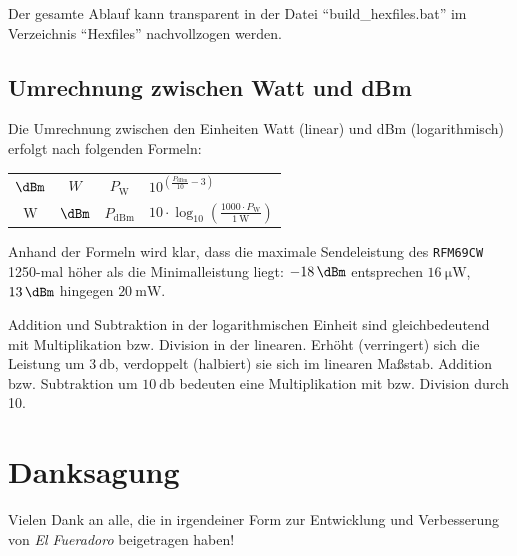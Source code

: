 \documentclass[paper=a4, parskip, numbers=noenddot, toc=listof, headsepline]{scrbook}
\newcommand{\anlage}{\emph{El Fueradoro}}
\begin{document}
				Der gesamte Ablauf kann transparent in der Datei \enquote{build\_hexfiles.bat} im Verzeichnis \enquote{Hexfiles} nachvollzogen werden.

			\section{Umrechnung zwischen Watt und dBm}
				Die Umrechnung zwischen den Einheiten Watt (linear) und dBm (logarithmisch) erfolgt nach folgenden Formeln:

				\begin{center}
					\begin{tabu}
						to .6
						$\si{\dBm}$  & $\si{W}$    & $P_\text{W}$   & $10^{\left(\frac{P_\text{dBm}}{10}-3\right)}$                                      \\[12pt]
						$\si{\watt}$ & $\si{\dBm}$ & $P_\text{dBm}$ & $10 {\cdot} \log_{10}\left( \frac{1000 {\cdot} P_\text{W}}{\SI{1}{\watt}} \right)$ \\
					\end{tabu}
				\end{center}

				Anhand der Formeln wird klar, dass die maximale Sendeleistung des \texttt{RFM69CW} 1250-mal höher als die Minimalleistung liegt: $\SI{-18}{\dBm}$ entsprechen $\SI{16}{\micro\watt}$, $\SI{13}{\dBm}$ hingegen $\SI{20}{\milli\watt}$.

				Addition und Subtraktion in der logarithmischen Einheit sind gleichbedeutend mit Multiplikation bzw. Division in der linearen. Erhöht (verringert) sich die Leistung um $\SI{3}{\decibel}$, verdoppelt (halbiert) sie sich im linearen Maßstab. Addition bzw. Subtraktion um $\SI{10}{\decibel}$ bedeuten eine Multiplikation mit bzw. Division durch 10.

				\listoffigures
				\listoftables

		\chapter*{Danksagung}%

			Vielen Dank an alle, die in irgendeiner Form zur Entwicklung und Verbesserung von {\anlage} beigetragen haben!
\end{document}
